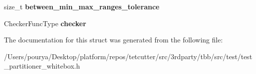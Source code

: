 \begin{DoxyCompactItemize}
\item 
\hypertarget{structuniform__iterations__distribution_1_1ParallelTestBody_1_1use__case__settings__t_aff746681bc0b583e77ba1ed0e5a71fa4}{}size\+\_\+t {\bfseries between\+\_\+min\+\_\+max\+\_\+ranges\+\_\+tolerance}\label{structuniform__iterations__distribution_1_1ParallelTestBody_1_1use__case__settings__t_aff746681bc0b583e77ba1ed0e5a71fa4}

\item 
\hypertarget{structuniform__iterations__distribution_1_1ParallelTestBody_1_1use__case__settings__t_a4c7c6ae8400b62ad71c355af0f5b9d26}{}Checker\+Func\+Type {\bfseries checker}\label{structuniform__iterations__distribution_1_1ParallelTestBody_1_1use__case__settings__t_a4c7c6ae8400b62ad71c355af0f5b9d26}

\end{DoxyCompactItemize}


The documentation for this struct was generated from the following file\+:\begin{DoxyCompactItemize}
\item 
/\+Users/pourya/\+Desktop/platform/repos/tetcutter/src/3rdparty/tbb/src/test/test\+\_\+partitioner\+\_\+whitebox.\+h\end{DoxyCompactItemize}
